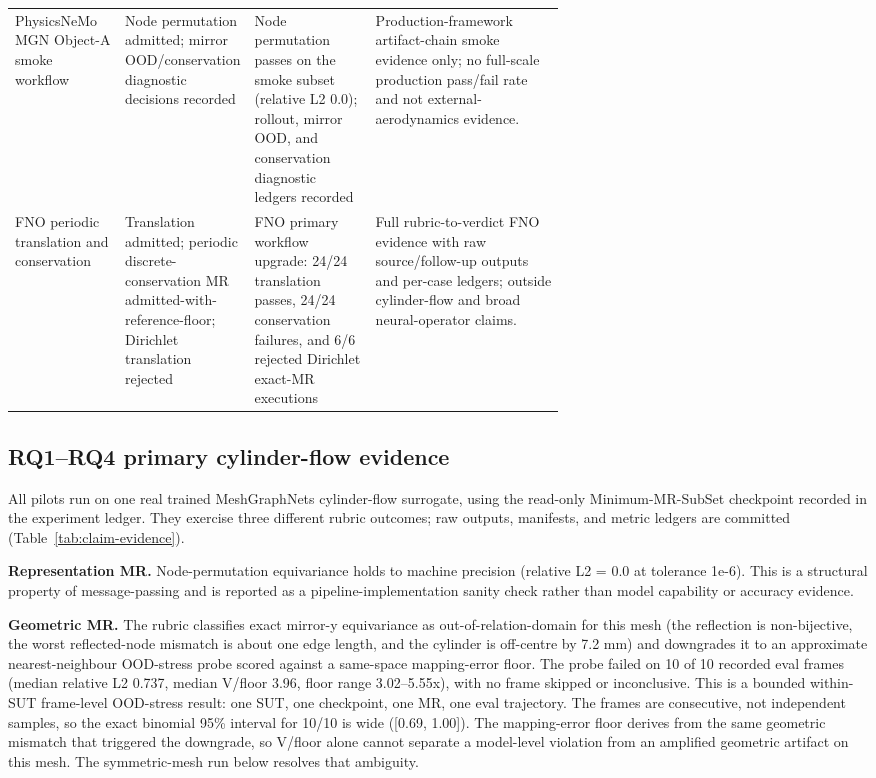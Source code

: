 \documentclass[preprint,12pt]{elsarticle}
\begin{document}
{\begin{xltabular}{\linewidth}{@{}>{\raggedright\arraybackslash}p{0.20\linewidth}>{\raggedright\arraybackslash}p{0.22\linewidth}>{\raggedright\arraybackslash}p{0.22\linewidth}Y@{}}
PhysicsNeMo MGN Object-A smoke workflow & Node permutation admitted; mirror OOD/\allowbreak conservation diagnostic decisions recorded & Node permutation passes on the smoke subset (relative L2 0.0); rollout, mirror OOD, and conservation diagnostic ledgers recorded & Production-framework artifact-chain smoke evidence only; no full-scale production pass/fail rate and not external-aerodynamics evidence. \\
FNO periodic translation and conservation & Translation admitted; periodic discrete-conservation MR admitted-with-reference-floor; Dirichlet translation rejected & FNO primary workflow upgrade: 24/24 translation passes, 24/24 conservation failures, and 6/6 rejected Dirichlet exact-MR executions & Full rubric-to-verdict FNO evidence with raw source/follow-up outputs and per-case ledgers; outside cylinder-flow and broad neural-operator claims. \\
\end{xltabular}
}

\subsection{RQ1--RQ4 primary cylinder-flow evidence}
\label{subsec:within-sut-pilot}

All pilots run on one real trained MeshGraphNets cylinder-flow surrogate, using the read-only Minimum-MR-SubSet checkpoint recorded in the experiment ledger. They exercise three different rubric outcomes; raw outputs, manifests, and metric ledgers are committed (Table~\ref{tab:claim-evidence}).

\textbf{Representation MR.} Node-permutation equivariance holds to machine precision (relative L2 = 0.0 at tolerance 1e-6). This is a structural property of message-passing and is reported as a pipeline-implementation sanity check rather than model capability or accuracy evidence.

\textbf{Geometric MR.} The rubric classifies exact mirror-y equivariance as out-of-relation-domain for this mesh (the reflection is non-bijective, the worst reflected-node mismatch is about one edge length, and the cylinder is off-centre by 7.2 mm) and downgrades it to an approximate nearest-neighbour OOD-stress probe scored against a same-space mapping-error floor. The probe failed on 10 of 10 recorded eval frames (median relative L2 0.737, median V/floor 3.96, floor range 3.02--5.55x), with no frame skipped or inconclusive. This is a bounded within-SUT frame-level OOD-stress result: one SUT, one checkpoint, one MR, one eval trajectory. The frames are consecutive, not independent samples, so the exact binomial 95\% interval for 10/10 is wide ([0.69, 1.00]). The mapping-error floor derives from the same geometric mismatch that triggered the downgrade, so V/floor alone cannot separate a model-level violation from an amplified geometric artifact on this mesh. The symmetric-mesh run below resolves that ambiguity.
\end{document}
